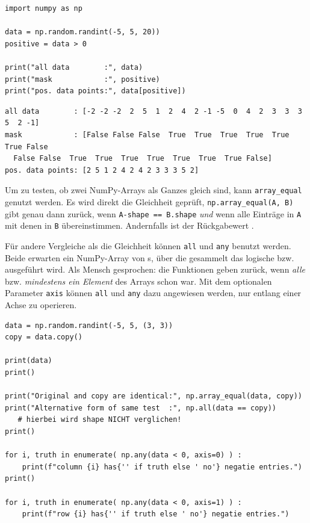 \begin{codebox}
\begin{verbatim}
import numpy as np

data = np.random.randint(-5, 5, 20))
positive = data > 0

print("all data        :", data)
print("mask            :", positive)
print("pos. data points:", data[positive])
\end{verbatim}
\end{codebox}

\begin{cmdbox}
\begin{verbatim}
all data        : [-2 -2 -2  2  5  1  2  4  2 -1 -5  0  4  2  3  3  3  5  2 -1]
mask            : [False False False  True  True  True  True  True  True False 
  False False  True  True  True  True  True  True  True False]
pos. data points: [2 5 1 2 4 2 4 2 3 3 3 5 2]
\end{verbatim}
\end{cmdbox}

Um zu testen, ob zwei NumPy-Arrays als Ganzes gleich sind, kann \texttt{array\_equal} genutzt werden. Es wird direkt die Gleichheit geprüft, \ie \texttt{np.array\_equal(A, B)} gibt genau dann  zurück, wenn \texttt{A-shape == B.shape} \emph{und} wenn alle Einträge in \texttt{A} mit denen in \texttt{B} übereinstimmen. Andernfalls ist der Rückgabewert .

Für andere Vergleiche als die Gleichheit können \texttt{all} und \texttt{any} benutzt werden. Beide erwarten ein NumPy-Array von s, über die gesammelt das logische  bzw.  ausgeführt wird. Als Mensch gesprochen: die Funktionen geben  zurück, wenn \emph{alle} bzw. \emph{mindestens ein Element} des Arrays schon  war. Mit dem optionalen Parameter \texttt{axis} können \texttt{all} und \texttt{any} dazu angewiesen werden, nur entlang einer Achse zu operieren.

\begin{codebox}
\begin{verbatim}
data = np.random.randint(-5, 5, (3, 3))
copy = data.copy()

print(data)
print()

print("Original and copy are identical:", np.array_equal(data, copy))
print("Alternative form of same test  :", np.all(data == copy))
   # hierbei wird shape NICHT verglichen!
print()

for i, truth in enumerate( np.any(data < 0, axis=0) ) :
    print(f"column {i} has{'' if truth else ' no'} negatie entries.")
print()

for i, truth in enumerate( np.any(data < 0, axis=1) ) :
    print(f"row {i} has{'' if truth else ' no'} negatie entries.")
\end{verbatim}
\end{codebox}

